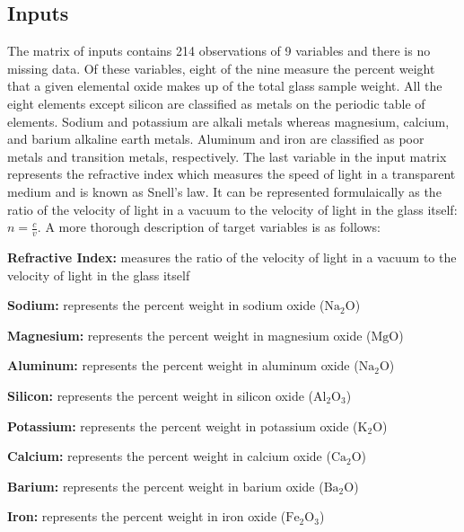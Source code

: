 \documentclass[12pt,halfline,a4paper]{ouparticle}
\begin{document}
\subsection{Inputs}
The matrix of inputs contains 214 observations of 9 variables and there is no missing data. Of these variables, eight of the nine measure the percent weight that a given elemental oxide makes up of the total glass sample weight. All the eight elements except silicon are classified as metals on the periodic table of elements. Sodium and potassium are alkali metals whereas magnesium, calcium, and barium alkaline earth metals. Aluminum and iron are classified as poor metals and transition metals, respectively. The last variable in the input matrix represents the refractive index which measures the speed of light in a transparent medium and is known as Snell's law. It can be represented formulaically as the ratio of the velocity of light in a vacuum to the velocity of light in the glass itself: $n = \frac{c}{v}$. A more thorough description of target variables is as follows: 
\begin{description}
\item \textbf{Refractive Index:}
measures the ratio of the velocity of light in a vacuum to the velocity of light in the glass itself
\item \textbf{Sodium:}
represents the percent weight in sodium oxide ($\mathrm{Na_{2}O}$)
\item \textbf{Magnesium:}
represents the percent weight in magnesium oxide ($\mathrm{MgO}$)
\item \textbf{Aluminum:}
represents the percent weight in aluminum oxide ($\mathrm{Na_{2}O}$)
\item \textbf{Silicon:}
represents the percent weight in silicon oxide ($\mathrm{Al_{2}O_{3}}$)
\item \textbf{Potassium:}
represents the percent weight in potassium oxide ($\mathrm{K_{2}O}$)
\item \textbf{Calcium:}
represents the percent weight in calcium oxide ($\mathrm{Ca_{2}O}$)
\item \textbf{Barium:}
represents the percent weight in barium oxide ($\mathrm{Ba_{2}O}$)
\item \textbf{Iron:}
represents the percent weight in iron oxide ($\mathrm{Fe_{2}O_{3}}$)
\end{description}
\end{document}
